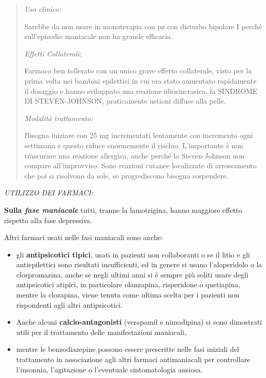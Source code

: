 \documentclass[]{article}
\begin{document}
\begin{quote}
\emph{\emph{Uso clinico:}}

Sarebbe da non usare in monoterapia con pz con disturbo bipolare I
perché sull'episodio maniacale non ha grande efficacia.

\emph{\emph{Effetti Collaterali: }}

Farmaco ben tollerato con un unico grave effetto collaterale, visto per
la prima volta nei bambini epilettici in cui era stato aumentato
rapidamente il dosaggio e hanno sviluppato una reazione idiosincrasica,
la SINDROME DI STEVEN-JOHNSON, praticamente ustioni diffuse alla pelle.

\emph{\emph{Modalità trattamento:}}

Bisogna iniziare con 25 mg incrementati lentamente con incremento ogni
settimana e questo riduce enormemente il rischio. L'importante è non
trascurare una reazione allergica, anche perché la Steven-Johnson non
compare all'improvviso. Sono reazioni cutanee localizzate di
arrossamento che poi si risolvono da sole, se progrediscono bisogna
sospendere.
\end{quote}

\emph{UTILIZZO DEI FARMACI:}

\textbf{Sulla \emph{fase maniacale}} tutti, tranne la lamotrigina, hanno
maggiore effetto rispetto alla fase depressiva.

Altri farmaci usati nelle fasi maniacali sono anche:

\begin{itemize}
\item
  gli \textbf{antipsicotici tipici}, usati in pazienti non collaboranti
  o se il litio e gli antiepilettici sono risultati insufficienti, ed in
  genere si usano l'aloperidolo o la clorpromazina, anche se negli
  ultimi anni si è sempre più soliti usare degli antipsicotici atipici,
  in particolare olanzapina, risperidone o quetiapina, mentre la
  clozapina, viene tenuta come ultima scelta per i pazienti non
  rispondenti agli altri antipsicotici.
\item
  Anche alcuni \textbf{calcio-antagonisti} (verapamil e nimodipina) si
  sono dimostrati utili per il trattamento delle manifestazioni
  maniacali,
\item
  mentre le benzodiazepine possono essere prescritte nelle fasi iniziali
  del trattamento in associazione agli altri farmaci antimaniacali per
  controllare l'insonnia, l'agitazione o l'eventuale sintomatologia
  ansiosa.
\end{itemize}
\end{document}
